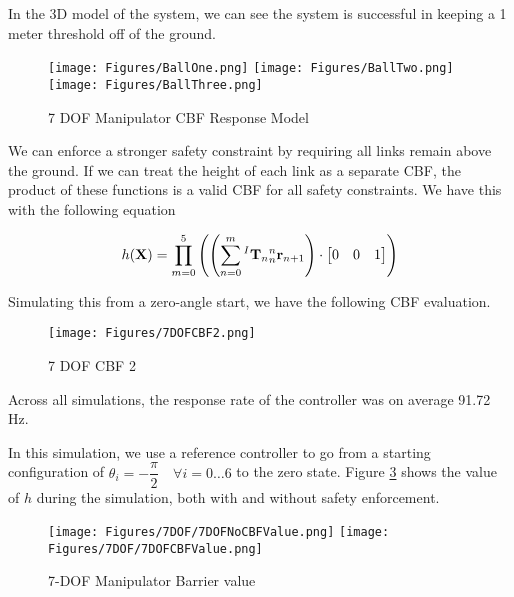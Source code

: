 \noindent In the 3D model of the system, we can see the system is successful in keeping a 1 meter threshold off of the ground.

\begin{figure}[H]
    \centering
    \texttt{[image: Figures/BallOne.png]}
          \texttt{[image: Figures/BallTwo.png]}
          \texttt{[image: Figures/BallThree.png]}
          
    \caption{7 DOF Manipulator CBF Response Model}
    \label{fig:7DOFBall1}
    
\end{figure}

\noindent We can enforce a stronger safety constraint by requiring all links remain above the ground. If we can treat the height of each link as a separate CBF, the product of these functions is a valid CBF for all safety constraints. We have this with the following equation

\begin{align}
    h(\mathbf{X}) =  \prod_{m = 0}^5 \left ( \left (\sum_{n=0}^m {^I\mathbf{T}_n}{^n_n\mathbf{r}_{n+1}} \right) \cdot \begin{bmatrix} 0 & 0 & 1\end{bmatrix} \right )
\end{align}

\noindent Simulating this from a zero-angle start, we have the following CBF evaluation.

\begin{figure}[H]
    \centering
    \texttt{[image: Figures/7DOFCBF2.png]}
    \caption{7 DOF CBF 2}
    \label{fig:7dofcbf1}
\end{figure}

\noindent Across all simulations, the response rate of the controller was on average 91.72 Hz.

\noindent In this simulation, we use a reference controller to go from a starting configuration of $\theta_i = -\dfrac{\pi}{2} \quad \forall i= 0\hdots6$ to the zero state. Figure \ref{fig:7dofbarriervalue2} shows the value of $h$ during the simulation, both with and without safety enforcement.

\begin{figure}[H]
    \centering
    \texttt{[image: Figures/7DOF/7DOFNoCBFValue.png]}
    \texttt{[image: Figures/7DOF/7DOFCBFValue.png]}
    \caption{7-DOF Manipulator Barrier value}
    \label{fig:7dofbarriervalue2}
\end{figure}

